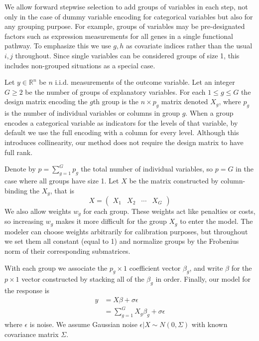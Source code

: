 \documentclass{imsart}
\newcommand{\real}{\mathbb{R}}
\begin{document}
We allow forward stepwise selection to add groups of variables in each
step, not only in the case of dummy variable encoding for categorical
variables but also for any grouping purpose. For example, groups of
variables may be pre-designated factors such as expression
measurements for all genes in a single functional pathway.
To emphasize this we use $g, h$ as covariate indices rather than the usual
$i, j$ throughout. Since single variables can be considered groups of
size 1, this includes non-grouped situations as a special
case.

Let $y \in \real^n$ be $n$ i.i.d. measurements of the outcome variable.
Let an integer $G \geq 2$ be the number of groups of explanatory variables.
For each $1 \leq g \leq G$ the design matrix encoding the
$g$th group is the $n \times p_g$ matrix denoted $X_g$, where $p_g$ is
the number of individual variables or columns in group $g$.
When a group encodes a categorical variable as indicators for the
levels of that variable, by default we use the full encoding with a
column for every level. Although this introduces collinearity, our method
does not require the design matrix to have full rank.

Denote by $p = \sum_{g=1}^Gp_g$
the total number of individual variables, so $p = G$ in the
case where all groups have size 1. Let $X$ be the matrix constructed
by column-binding the $X_g$, that is  
\begin{equation*}
X = \begin{pmatrix} X_1 & X_2 & \cdots & X_G  \end{pmatrix}
\end{equation*}
We also allow weights $w_g$ for each group. These
weights act like penalties or costs, so increasing $w_g$ makes it
more difficult for the group $X_g$ to enter the model. The
modeler can choose weights arbitrarily for calibration purposes,
but throughout we set them all constant (equal to 1) and normalize
groups by the Frobenius norm of their corresponding submatrices.

With each group we associate the $p_g \times 1$ coefficient vector
$\beta_g$, and write $\beta$ for the $p \times 1$ vector constructed
by stacking all of the $\beta_g$ in order.  Finally, our model for the
response is
\begin{equation}
\begin{aligned}
\label{eq:gmodel}
y & = X \beta + \sigma \epsilon \\
   & = \sum_{g=1}^G X_g \beta_g + \sigma \epsilon
\end{aligned}
\end{equation}
where $\epsilon$ is noise. We assume Gaussian noise
$\epsilon | X \sim N(0, \Sigma)$ with known covariance matrix $\Sigma$.
\end{document}
